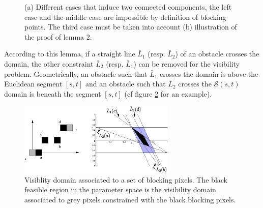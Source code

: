 \documentclass[fleqn,twoside]{article}
\begin{document}
\begin{figure}[htbp]
  \begin{center}
     \caption{ (a) Different cases that induce two connected components, the left case and the middle case
      are impossible by definition  of blocking points. The third case
      must  be  taken into account  (b)  illustration of the proof of
      lemma 2.}
    \label{preuve_2_1}
  \end{center}
\end{figure}


According to  this lemma,   if   a straight  line $\bar{L}_1$   (resp.
$\bar{L}_2$)  of an obstacle crosses the  domain, the other constraint
$\bar{L}_2$ (resp.  $\bar{L}_1$)  can be  removed  for the  visibility
problem.  Geometrically, an obstacle such that $\bar{L}_1$ crosses the
domain is above  the Euclidean segment   $[s,t]$ and an obstacle  such
that $\bar{L}_2$ crosses the $\mathcal{S}(s,t)$  domain is beneath the
segment $[s,t]$ (cf figure  \ref{coupures} for an example). %

\begin{figure}[htbp]
  \begin{center}
    \includegraphics[width=7.5cm]{coupuresbis.ps}
    \caption{Visiblity domain associated to a set of blocking pixels. The black feasible region in
      the parameter space is the visibility domain associated to grey pixels constrained with the
      black blocking pixels.}
    \label{coupures}
  \end{center}
\end{figure}
\end{document}
